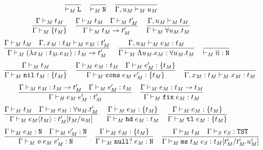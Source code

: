 \begin{figure}[p]
\[
\frac
{}
{ \vdash_{\mathit{M}} \mathtt{L}}
\quad
\frac
{}
{ \vdash_{\mathit{M}} \mathtt{N}}
\quad
\frac
{}
{\Gamma , u_{\mathit{M}} \vdash_{\mathit{M}} u_{\mathit{M}}}
\]
\[
\frac
{\Gamma \vdash_{\mathit{M}} t_{\mathit{M}}}
{\Gamma \vdash_{\mathit{M}} \lbrace t_{\mathit{M}} \rbrace}
\quad
\frac
{\Gamma \vdash_{\mathit{M}} t_{\mathit{M}} \quad \Gamma \vdash_{\mathit{M}} t_{\mathit{M}}'}
{\Gamma \vdash_{\mathit{M}} t_{\mathit{M}} \rightarrow t_{\mathit{M}}'}
\quad
\frac
{\Gamma, u_{\mathit{M}} \vdash_{\mathit{M}} t_{\mathit{M}}}
{\Gamma \vdash_{\mathit{M}} \forall u_{\mathit{M}} . t_{\mathit{M}}}
\]
\bigskip
\[
\frac
{\Gamma \vdash_{\mathit{M}} t_{\mathit{M}} \quad \Gamma , x_{\mathit{M}} : t_{\mathit{M}} \vdash_{\mathit{M}} e_{\mathit{M}} : t_{\mathit{M}}'}
{\Gamma \vdash_{\mathit{M}} (\lambda x_{\mathit{M}} : t_{\mathit{M}} . e_{\mathit{M}}) : t_{\mathit{M}} \rightarrow t_{\mathit{M}}'}
\quad
\frac
{\Gamma , u_{\mathit{M}} \vdash_{\mathit{M}} e_{\mathit{M}} : t_{\mathit{M}}}
{\Gamma \vdash_{\mathit{M}} \Lambda u_{\mathit{M}} . e_{\mathit{M}} : \forall u_{\mathit{M}} . t_{\mathit{M}}}
\quad
\frac
{}
{ \vdash_{\mathit{M}} \overline{n} : \mathtt{N}}
\]
\[
\frac
{\Gamma \vdash_{\mathit{M}} t_{\mathit{M}}}
{\Gamma \vdash_{\mathit{M}} \mathtt{nil} \; t_{\mathit{M}} : \lbrace t_{\mathit{M}} \rbrace}
\quad
\frac
{\Gamma \vdash_{\mathit{M}} e_{\mathit{M}} : t_{\mathit{M}} \quad \Gamma \vdash_{\mathit{M}} e_{\mathit{M}}' : \lbrace t_{\mathit{M}} \rbrace}
{\Gamma \vdash_{\mathit{M}} \mathtt{cons} \; e_{\mathit{M}} \; e_{\mathit{M}}' : \lbrace t_{\mathit{M}} \rbrace}
\quad
\frac
{}
{\Gamma , x_{\mathit{M}} : t_{\mathit{M}} \vdash_{\mathit{M}} x_{\mathit{M}} : t_{\mathit{M}}}
\]
\[
\frac
{\Gamma \vdash_{\mathit{M}} e_{\mathit{M}} : t_{\mathit{M}} \rightarrow t_{\mathit{M}}' \quad \Gamma \vdash_{\mathit{M}} e_{\mathit{M}}' : t_{\mathit{M}}}
{\Gamma\vdash_{\mathit{H}}e_{\mathit{M}} \; e_{\mathit{M}}':t_{\mathit{M}}'}
\quad
\frac
{\Gamma \vdash_{\mathit{M}} e_{\mathit{M}} : t_{\mathit{M}} \rightarrow t_{\mathit{M}}}
{\Gamma \vdash_{\mathit{M}} \mathtt{fix} \; e_{\mathit{M}} : t_{\mathit{M}}}
\]
\[
\frac
{\Gamma \vdash_{\mathit{M}} t_{\mathit{M}} \quad \Gamma \vdash_{\mathit{M}} e_{\mathit{M}} : \forall u_{\mathit{M}} . t_{\mathit{M}}'}
{\Gamma \vdash_{\mathit{M}} e_{\mathit{M}} \langle t_{\mathit{M}} \rangle : t_{\mathit{M}}'[t_{\mathit{M}}/u_{\mathit{M}}]}
\quad
\frac
{\Gamma \vdash_{\mathit{M}} e_{\mathit{M}} : \lbrace t_{\mathit{M}} \rbrace}
{\Gamma \vdash_{\mathit{M}} \mathtt{hd} \; e_{\mathit{M}} : t_{\mathit{M}}}
\quad
\frac
{\Gamma \vdash_{\mathit{M}} e_{\mathit{M}} : \lbrace t_{\mathit{M}} \rbrace}
{\Gamma \vdash_{\mathit{M}} \mathtt{tl} \; e_{\mathit{M}} : \lbrace t_{\mathit{M}} \rbrace}
\]
\[
\frac
{\Gamma \vdash_{\mathit{M}} e_{\mathit{M}} : \mathtt{N} \quad \Gamma \vdash_{\mathit{M}} e_{\mathit{M}}' : \mathtt{N}}
{\Gamma \vdash_{\mathit{M}} \mathit{o} \; e_{\mathit{M}} \; e_{\mathit{M}}' : \mathtt{N}}
\quad
\frac
{\Gamma \vdash_{\mathit{M}} e_{\mathit{M}} : \lbrace t_{\mathit{M}} \rbrace}
{\Gamma \vdash_{\mathit{M}} \mathtt{null?} \; e_{\mathit{M}} : \mathtt{N}}
\quad
\frac
{\Gamma \vdash_{\mathit{M}} t_{\mathit{M}} \quad \Gamma \vdash_{\mathit{S}} e_{\mathit{S}} : \mathtt{TST}}
{\Gamma \vdash_{\mathit{M}} \mathtt{ms} \; t_{\mathit{M}} \; e_{\mathit{S}} : t_{\mathit{M}}[t_{\mathit{M}}^{i}/t_{\mathit{M}}^{i} . u_{\mathit{M}}^{i}]}
\]

\end{figure}
